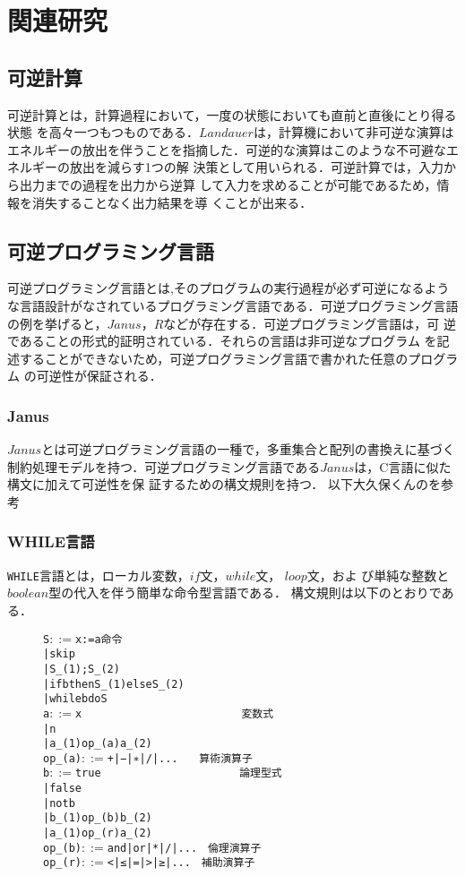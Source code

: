 
\chapter{関連研究}
\section{可逆計算}
可逆計算とは，計算過程において，一度の状態においても直前と直後にとり得る状態
を高々一つもつものである．$Landauer$は，計算機において非可逆な演算はエネルギーの放出を伴うことを指摘した．可逆的な演算はこのような不可避なエネルギーの放出を減らす1つの解
決策として用いられる．可逆計算では，入力から出力までの過程を出力から逆算
して入力を求めることが可能であるため，情報を消失することなく出力結果を導
くことが出来る．

\section{可逆プログラミング言語}
可逆プログラミング言語とは,そのプログラムの実行過程が必ず可逆になるよう
な言語設計がなされているプログラミング言語である．可逆プログラミング言語
の例を挙げると，$Janus$，$R$などが存在する．可逆プログラミング言語は，可
逆であることの形式的証明されている．それらの言語は非可逆なプログラム
を記述することができないため，可逆プログラミング言語で書かれた任意のプログラム
の可逆性が保証される．

 \subsection{Janus}
$Janus$とは可逆プログラミング言語の一種で，多重集合と配列の書換えに基づく制約処理モデルを持つ．可逆プログラミング言語である$Janus$は，C言語に似た構文に加えて可逆性を保
証するための構文規則を持つ．
以下大久保くんのを参考

 \subsection{WHILE言語}
\texttt{WHILE}言語とは，ローカル変数，$if$文，$while$文， $loop$文，およ
び単純な整数と$boolean$型の代入を伴う簡単な命令型言語である．
構文規則は以下のとおりである．\\
\begin{figure}[t]
\begin{alltt}
S \(::=\) x:=a                         命令
    |     skip
    |     S_(1);S_(2)
    |     if b then S_(1) else S_(2)
    |     while b do S
a \(::=\) x　　　　　　　　　　　　　　　変数式
    |     n
    |     a_(1) op_(a) a_(2)
op_(a) \(::=\) + | − | ∗ | / | ...　　算術演算子
b \(::=\) true 　　　　　　　　　　　　　論理型式
    | false 
    | not b
    | b_(1) op_(b)  b_(2)
    | a_(1) op_(r)  a_(2)
op_(b) \(::=\) and | or | * | / | ...　倫理演算子
op_(r) \(::=\) < | ≤ | = | > | ≥ | ...　補助演算子
\end{alltt}
\end{figure}
